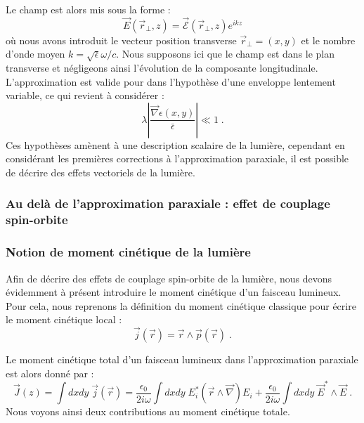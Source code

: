 \documentclass[a4paper,11pt]{article} %
\begin{document}
	Le champ est alors mis sous la forme :
	\begin{equation*}
		\vec{E}(\vec{r}_\perp , z) = \vec{\mathcal{E}}(\vec{r}_\perp, z) e^{i k z}
	\end{equation*}
	où nous avons introduit le vecteur position transverse $ \vec{r}_\perp = (x,y) $ et le nombre d'onde moyen $ k = \sqrt{\bar{\epsilon}} \omega / c  $. Nous supposons ici que le champ est dans le plan transverse et négligeons ainsi l'évolution de la composante longitudinale.\\
	
	L'approximation est valide pour dans l'hypothèse d'une enveloppe lentement variable, ce qui revient à considérer :
	\begin{equation*}
		\lambda \left| \frac{\vec{\nabla}\epsilon(x,y)}{\bar{\epsilon}} \right| \ll 1 \; .
	\end{equation*}
	Ces hypothèses amènent à une description scalaire de la lumière, cependant en considérant les premières corrections à l'approximation paraxiale, il est possible de décrire des effets vectoriels de la lumière.
	
	\subsubsection{Au delà de l'approximation paraxiale : effet de couplage spin-orbite}
	
	
	\subsubsection{Notion de moment cinétique de la lumière}
	Afin de décrire des effets de couplage spin-orbite de la lumière, nous devons évidemment à présent introduire le moment cinétique d'un faisceau lumineux. Pour cela, nous reprenons la définition du moment cinétique classique pour écrire le moment cinétique local :
	\begin{equation*}
		\vec{j}(\vec{r}) = \vec{r} \wedge \vec{p}(\vec{r}) \; .
	\end{equation*}
	
	Le moment cinétique total d'un faisceau lumineux dans l'approximation paraxiale est alors donné par :
	\begin{equation*}
		\vec{J} (z) = \int \! dx dy \; \vec{j}(\vec{r}) = \frac{\epsilon_0}{2 i \omega} \int \! dx dy \; E_i^* (\vec{r} \wedge \vec{\nabla} ) E_i + \frac{\epsilon_0}{2 i \omega} \int \! dx dy \; \vec{E}^* \! \wedge \vec{E} \; .
	\end{equation*}
	Nous voyons ainsi deux contributions au moment cinétique totale.\\
	
\end{document}
